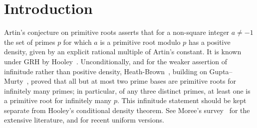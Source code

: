 \documentclass[11pt,reqno]{amsart}
\theoremstyle{plain}
\theoremstyle{definition}
\begin{document}
\begin{abstract}
We then measure, for eleven bases, the consecutive-pair Artin correlation
$\delta(a)$ over all $50{,}847{,}531$ consecutive prime pairs below $10^9$
with smaller member at least $5$. The exclusion weight $w$ correlates with $|\delta|$ at $r = 0.646$, but this
association is confounded with the conductor: $r(\log f, |\delta|) = -0.957$,
the partial correlation of $w$ given $\log f$ is only $0.136$, and the three
bases with no exclusion classes still carry $|\delta|$ up to $0.043$.
Restricting $\delta$ to gap classes outside the exclusion set yields a
positive value for all eight bases that possess such classes. Among the
quantities compared, the conductor of $\chi_a$ is the stronger descriptive
predictor of the global correlation; we do not claim it is the operative
mechanism.
\end{abstract}

\maketitle

\section{Introduction}
\label{sec:intro}

Artin's conjecture on primitive roots asserts that for a non-square integer
$a \neq -1$ the set of primes $p$ for which $a$ is a primitive root modulo $p$
has a positive density, given by an explicit rational multiple of Artin's
constant. It is known under GRH by Hooley~\cite{Hooley1967}. Unconditionally, and for the weaker assertion of infinitude rather than
positive density, Heath-Brown~\cite{HeathBrown1986}, building on
Gupta--Murty~\cite{GuptaMurty1984}, proved that all but at most two prime
bases are primitive roots for infinitely many primes; in particular, of any
three distinct primes, at least one is a primitive root for infinitely many
$p$. This infinitude statement should be kept separate from Hooley's
conditional density theorem. See Moree's survey~\cite{Moree2012} for the extensive
literature, and \cite{FanPollack2025, PeruccaShparlinski2025} for recent
uniform versions.
\end{document}
